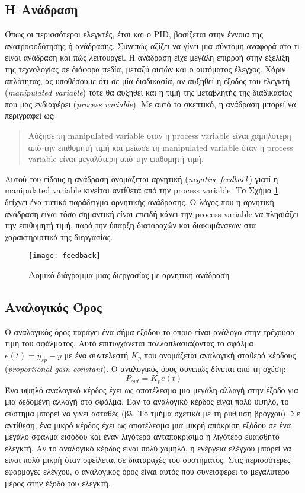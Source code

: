\subsection{H Ανάδραση}

Όπως οι περισσότεροι ελεγκτές, έτσι και ο PID, βασίζεται στην έννοια της ανατροφοδότησης ή ανάδρασης. Συνεπώς αξίζει να γίνει μια σύντομη αναφορά στο τι είναι ανάδραση και πώς λειτουργεί. Η ανάδραση είχε μεγάλη επιρροή στην εξέλιξη της τεχνολογίας σε διάφορα πεδία, μεταξύ αυτών και ο αυτόματος έλεγχος. Χάριν απλότητας, ας υποθέσουμε ότι σε μία διαδικασία, αν αυξηθεί η έξοδος του ελεγκτή (\emph{manipulated variable}) τότε θα αυξηθεί και η τιμή της μεταβλητής της διαδικασίας που μας ενδιαφέρει (\emph{process variable}). Με αυτό το σκεπτικό, η ανάδραση μπορεί να περιγραφεί ως:
\begin{quote}
Αύξησε τη manipulated variable όταν η process variable είναι χαμηλότερη από την επιθυμητή τιμή και μείωσε τη manipulated variable όταν η process variable είναι μεγαλύτερη από την επιθυμητή τιμή.
\end{quote}
Αυτού του είδους η ανάδραση ονομάζεται αρνητική (\emph{negative feedback}) γιατί η manipulated variable κινείται αντίθετα από την process variable. Το Σχήμα \ref{fig:feedback} δείχνει ένα τυπικό παράδειγμα αρνητικής ανάδρασης. Ο λόγος που η αρνητική ανάδραση είναι τόσο σημαντική είναι επειδή κάνει την process variable να πλησιάζει την επιθυμητή τιμή, παρά την ύπαρξη διαταραχών και διακυμάνσεων στα χαρακτηριστικά της διεργασίας.

\begin{figure}[h]
  \centering
  \texttt{[image: feedback]}
  \caption{Δομικό διάγραμμα μιας διεργασίας με αρνητική ανάδραση}
  \label{fig:feedback}
\end{figure}

\subsection{Αναλογικός Όρος}

Ο αναλογικός όρος παράγει ένα σήμα εξόδου το οποίο είναι ανάλογο στην τρέχουσα τιμή του σφάλματος. Αυτό επιτυγχάνεται πολλαπλασιάζοντας το σφάλμα $e(t)=y_{sp}-y$ με ένα συντελεστή $K_p$ που ονομάζεται αναλογική σταθερά κέρδους (\emph{proportional gain constant}). Ο αναλογικός όρος συνεπώς δίνεται από τη σχέση:
\begin{equation}
P_{out}=K_p e(t)
\label{eq:p_out}
\end{equation}
Ένα υψηλό αναλογικό κέρδος έχει ως αποτέλεσμα μια μεγάλη αλλαγή στην έξοδο για μια δεδομένη αλλαγή στο σφάλμα. Εάν το αναλογικό κέρδος είναι πολύ υψηλό, το σύστημα μπορεί να γίνει ασταθές (βλ. Το τμήμα σχετικά με τη ρύθμιση βρόγχου). Σε αντίθεση, ένα μικρό κέρδος έχει ως αποτέλεσμα μια μικρή απόκριση εξόδου σε ένα μεγάλο σφάλμα εισόδου και έναν λιγότερο ανταποκρίσιμο ή λιγότερο ευαίσθητο ελεγκτή. Αν το αναλογικό κέρδος είναι πολύ χαμηλό, η ενέργεια ελέγχου μπορεί να είναι πολύ μικρή όταν οφείλεται σε διαταραχές του συστήματος. Στις περισσότερες εφαρμογές ελέγχου, ο αναλογικός όρος είναι αυτός που συνεισφέρει το μεγαλύτερο μέρος στην έξοδο του ελεγκτή.

